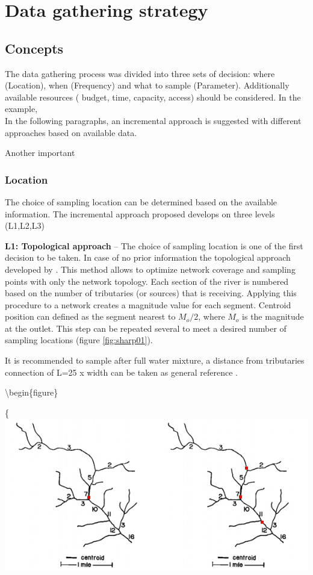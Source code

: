 \documentclass[
]{book}
\begin{document}
\hypertarget{data-gathering-strategy}{%
\chapter{Data gathering strategy}\label{data-gathering-strategy}}

\hypertarget{concepts-4}{%
\section{Concepts}\label{concepts-4}}

The data gathering process was divided into three sets of decision: where (Location), when (Frequency) and what to sample (Parameter). Additionally available resources ( budget, time, capacity, access) should be considered. In the example,\\
In the following paragraphs, an incremental approach is suggested with different approaches based on available data.

Another important

\hypertarget{location}{%
\subsection{Location}\label{location}}

The choice of sampling location can be determined based on the available information. The incremental approach proposed develops on three levels (L1,L2,L3)

\textbf{L1: Topological approach} -- The choice of sampling location is one of the first decision to be taken. In case of no prior information the topological approach developed by \citet{Sharp1971}. This method allows to optimize network coverage and sampling points with only the network topology. Each section of the river is numbered based on the number of tributaries (or sources) that is receiving. Applying this procedure to a network creates a magnitude value for each segment. Centroid position can defined as the segment nearest to \(M_o/2\), where \(M_o\) is the magnitude at the outlet. This step can be repeated several to meet a desired number of sampling locations (figure \ref{fig:sharp01}).

It is recommended to sample after full water mixture, a distance from tributaries connection of L=25 x width can be taken as general reference \citep{Alilou2019}.

\textbackslash begin\{figure\}

\{\centering \includegraphics[width=0.6\linewidth]{images/sharp01}
\end{document}
